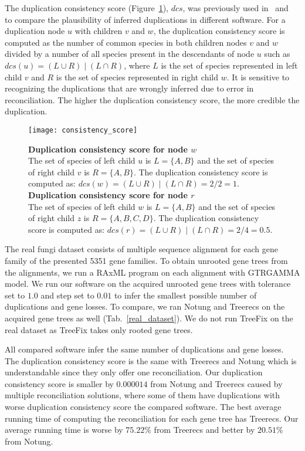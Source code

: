 The duplication consistency score (Figure~\ref{consistency_score}), $dcs$, was previously used in~\cite{treebest} and~\cite{spimap} to compare the plausibility of inferred duplications in different software. For a duplication node $u$ with children $v$ and $w$, the duplication consistency score is computed as the number of common species in both children nodes $v$ and $w$ divided by a number of all species present in the descendants of node $u$ such as $dcs(u) = (L \cup R) \mid (L \cap R)$, where $L$ is the set of species represented in left child $v$ and $R$ is the set of species represented in right child $w$. It is sensitive to recognizing the duplications that are wrongly inferred due to error in reconciliation. The higher the duplication consistency score, the more credible the duplication.

\begin{figure}[ht!]
	\centering
	\label{consistency_score}
  	\texttt{[image: consistency\_score]}
  	\caption[Duplication consistency score]{\textbf{Duplication consistency score for node $w$}\\
  	The set of species of left child $u$ is $L = \{A, B\}$ and the set of species of right child $v$ is $R = \{A, B\}$. The duplication consistency score is computed as: $dcs(w) = (L \cup R) \mid (L \cap R) = 2 / 2 = 1$.
  	\\
  	\textbf{Duplication consistency score for node $r$}\\
  	The set of species of left child $w$ is $L = \{A, B\}$ and the set of species of right child $z$ is $R = \{A, B, C, D\}$. The duplication consistency score is computed as: $dcs(r) = (L \cup R) \mid (L \cap R) = 2 / 4 = 0.5$.}
\end{figure}

The real fungi dataset consists of multiple sequence alignment for each gene family of the presented 5351 gene families. To obtain unrooted gene trees from the alignments, we run a RAxML program on each alignment with GTRGAMMA model. We run our software on the acquired unrooted gene trees with tolerance set to $1.0$ and step set to $0.01$ to infer the smallest possible number of duplications and gene losses. To compare, we ran Notung and Treerecs on the acquired gene trees as well (Tab.~\ref{real_dataset}). We do not run TreeFix on the real dataset as TreeFix takes only rooted gene trees.

All compared software infer the same number of duplications and gene losses. The duplication consistency score is the same with Treerecs and Notung which is understandable since they only offer one reconciliation. Our duplication consistency score is smaller by $0.000014$ from Notung and Treerecs caused by multiple reconciliation solutions, where some of them have duplications with worse duplication consistency score the compared software. The best average running time of computing the reconciliation for each gene tree has Treerecs. Our average running time is worse by $75.22\%$ from Treerecs and better by $20.51\%$ from Notung.


